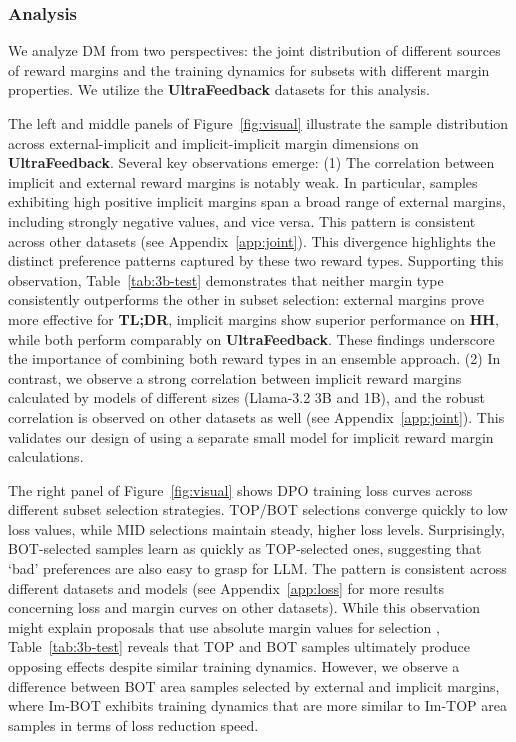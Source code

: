 {\begin{itemize}[leftmargin=*]
\end{itemize}


\subsubsection{Analysis}
\label{exp:analysis}
We analyze DM from two perspectives: the joint distribution of different sources of reward margins and the training dynamics for subsets with different margin properties. We utilize the \textbf{UltraFeedback} datasets for this analysis.

The left and middle panels of Figure~\ref{fig:visual} illustrate the sample distribution across external-implicit and implicit-implicit margin dimensions on \textbf{UltraFeedback}. Several key observations emerge: (1) The correlation between implicit and external reward margins is notably weak. In particular, samples exhibiting high positive implicit margins span a broad range of external margins, including strongly negative values, and vice versa. This pattern is consistent across other datasets (see Appendix~\ref{app:joint}). This divergence highlights the distinct preference patterns captured by these two reward types. Supporting this observation, Table~\ref{tab:3b-test} demonstrates that neither margin type consistently outperforms the other in subset selection: external margins prove more effective for \textbf{TL;DR}, implicit margins show superior performance on \textbf{HH}, while both perform comparably on \textbf{UltraFeedback}. These findings underscore the importance of combining both reward types in an ensemble approach. (2) In contrast, we observe a strong correlation between implicit reward margins calculated by models of different sizes (Llama-3.2 3B and 1B), and the robust correlation is observed on other datasets as well (see Appendix~\ref{app:joint}). 
This validates our design of using a separate small model for implicit reward margin calculations.

The right panel of Figure~\ref{fig:visual} shows DPO training loss curves across different subset selection strategies. TOP/BOT selections converge quickly to low loss values, while MID selections maintain steady, higher loss levels. Surprisingly, BOT-selected samples learn as quickly as TOP-selected ones, suggesting that `bad' preferences are also easy to grasp for LLM. The pattern is consistent across different datasets and models (see Appendix~\ref{app:loss} for more results concerning loss and margin curves on other datasets). While this observation might explain proposals that use absolute margin values for selection \citep{muldrew2024active}, Table~\ref{tab:3b-test} reveals that TOP and BOT samples ultimately produce opposing effects despite similar training dynamics. 
However, we observe a difference between BOT area samples selected by external and implicit margins, where Im-BOT exhibits training dynamics that are more similar to Im-TOP area samples in terms of loss reduction speed.


}
